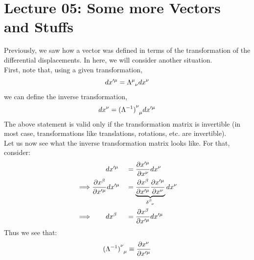 \section*{Lecture 05: Some more Vectors and Stuffs}
Previously, we saw how a vector was defined in terms of the transformation of the differential displacements. In here, we will consider another situation.\\[0.2cm] 
First, note that, using a given transformation,
$$dx'^\mu = \tensor{\Lambda}{^\mu _\nu} dx^\nu$$
we can define the inverse transformation,
$$dx^\nu = \tensor{{(\Lambda^{-1})}}{^\nu _\mu} dx'^\mu$$
The above statement is valid only if the transformation matrix is invertible (in most case, transformations like translations, rotations, etc. are invertible). \\ Let us now see what the inverse transformation matrix looks like. For that, consider:
\begin{alignat*}{3}
&\qquad dx'^\mu &&= \pdv{x'^\mu}{x^\nu} dx^\nu\\
\implies & \pdv{x^\beta}{x'^\mu}dx'^\mu &&= \underbrace{\pdv{x^\beta}{x'^\mu}\pdv{x'^\mu}{x^\nu}}_{\tensor{\delta}{^\beta _\nu}} dx^\nu\\
\implies & \qquad dx^\beta &&= \pdv{x^\beta}{x'^\mu}dx'^\mu
\end{alignat*}
Thus we see that:
$$\tensor{{(\Lambda^{-1})}}{^\nu _\mu} \equiv \pdv{x^\nu}{x'^\mu}$$
